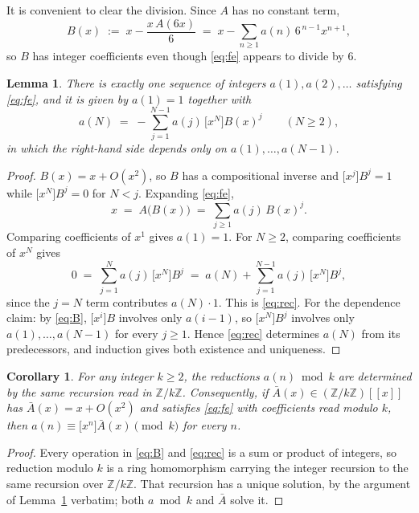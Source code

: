\documentclass[11pt,a4paper]{article}
\theoremstyle{plain}
\newtheorem{lemma}[theorem]{Lemma}
\newtheorem{corollary}[theorem]{Corollary}
\theoremstyle{definition}
\begin{document}
It is convenient to clear the division. Since $A$ has no constant term,
\begin{equation}\label{eq:B}
B(x)\;:=\;x-\frac{x\,A(6x)}{6}\;=\;x-\sum_{n\ge1}a(n)\,6^{\,n-1}x^{n+1},
\end{equation}
so $B$ has integer coefficients even though \eqref{eq:fe} appears to divide by $6$.

\begin{lemma}\label{lem:unique}
There is exactly one sequence of integers $a(1),a(2),\dots$ satisfying \eqref{eq:fe}, and
it is given by $a(1)=1$ together with
\begin{equation}\label{eq:rec}
a(N)\;=\;-\sum_{j=1}^{N-1}a(j)\,\bigl[x^{N}\bigr]B(x)^{j}\qquad(N\ge2),
\end{equation}
in which the right-hand side depends only on $a(1),\dots,a(N-1)$.
\end{lemma}

\begin{proof}
$B(x)=x+O(x^{2})$, so $B$ has a compositional inverse and $\bigl[x^{j}\bigr]B^{j}=1$
while $\bigl[x^{N}\bigr]B^{j}=0$ for $N<j$. Expanding \eqref{eq:fe},
\[
x\;=\;A\bigl(B(x)\bigr)\;=\;\sum_{j\ge1}a(j)\,B(x)^{j} .
\]
Comparing coefficients of $x^{1}$ gives $a(1)=1$. For $N\ge2$, comparing coefficients of
$x^{N}$ gives
\[
0\;=\;\sum_{j=1}^{N}a(j)\,\bigl[x^{N}\bigr]B^{j}
\;=\;a(N)+\sum_{j=1}^{N-1}a(j)\,\bigl[x^{N}\bigr]B^{j},
\]
since the $j=N$ term contributes $a(N)\cdot1$. This is \eqref{eq:rec}. For the dependence
claim: by \eqref{eq:B}, $\bigl[x^{i}\bigr]B$ involves only $a(i-1)$, so
$\bigl[x^{N}\bigr]B^{j}$ involves only $a(1),\dots,a(N-1)$ for every $j\ge1$. Hence
\eqref{eq:rec} determines $a(N)$ from its predecessors, and induction gives both existence
and uniqueness.
\end{proof}

\begin{corollary}\label{cor:mod}
For any integer $k\ge2$, the reductions $a(n)\bmod k$ are determined by the same recursion
read in $\mathbb{Z}/k\mathbb{Z}$. Consequently, if $\bar A(x)\in(\mathbb{Z}/k\mathbb{Z})[[x]]$ has
$\bar A(x)=x+O(x^{2})$ and satisfies \eqref{eq:fe} with coefficients read modulo $k$, then
$a(n)\equiv\bigl[x^{n}\bigr]\bar A(x) \pmod k$ for every $n$.
\end{corollary}

\begin{proof}
Every operation in \eqref{eq:B} and \eqref{eq:rec} is a sum or product of integers, so
reduction modulo $k$ is a ring homomorphism carrying the integer recursion to the same
recursion over $\mathbb{Z}/k\mathbb{Z}$. That recursion has a unique solution, by the argument of
Lemma~\ref{lem:unique} verbatim; both $a\bmod k$ and $\bar A$ solve it.
\end{proof}
\end{document}
